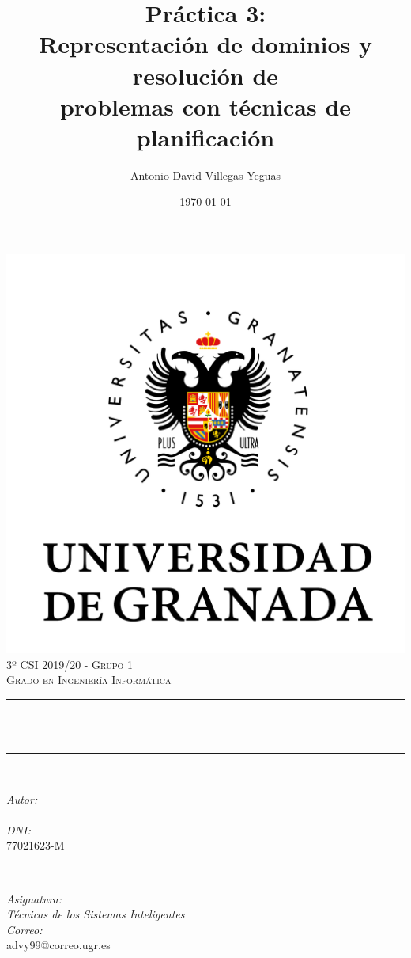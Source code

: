 \documentclass[11pt, spanish]{article}
\title{Práctica 3:\\
 Representación de dominios y resolución de\\ problemas con técnicas de planificación  \hspace{0.05cm} }
\author{Antonio David Villegas Yeguas}
\date{\today}
\makeatletter
\let\thetitle\@title
\let\theauthor\@author
\makeatother
\begin{document}

\begin{titlepage}
    \centering
    \vspace*{0.3 cm}
    \includegraphics[scale = 0.50]{ugr.png}\\[0.7 cm]
    \textsc{\large 3º CSI 2019/20 - Grupo 1}\\[0.5 cm]            
    \textsc{\large Grado en Ingeniería Informática}\\[0.5 cm]              
    \rule{\linewidth}{0.2 mm} \\[0.2 cm]
    { \huge \bfseries \thetitle}\\
    \rule{\linewidth}{0.2 mm} \\[1 cm]
    
    \begin{minipage}{0.4\textwidth}
        \begin{flushleft} \large
            \emph{Autor:}\\
            \theauthor\\ 
			 \emph{DNI:}\\
            77021623-M
            \end{flushleft}
            \end{minipage}~
            \begin{minipage}{0.4\textwidth}
            \begin{flushright} \large
            \emph{Asignatura: \\
            Técnicas de los Sistemas Inteligentes}   \\     
            \emph{Correo:}\\
            advy99@correo.ugr.es           
        \end{flushright}
    \end{minipage}\\[0.5cm]
  

\end{titlepage}
\end{document}
